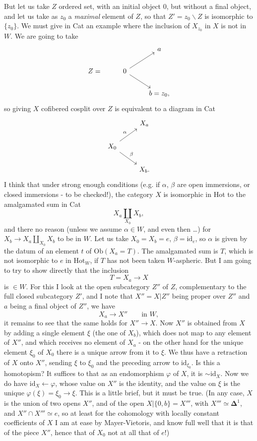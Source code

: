 But let us take $Z$ ordered set, with an initial object $0$, but without a final object, and let us take as $z_0$ a \textit{maximal} element of $Z$, so that $Z' = z_0\backslash Z$ is isomorphic to $\{z_0\}$. We must give in Cat an example where the inclusion of $X_{z_0}$ in $X$ is not in $W$. We are going to take
\[
\begin{tikzcd}
 & & a \\
Z = & 0 \arrow[ur] \arrow[dr] & \\
 & & b = z_0,
\end{tikzcd}
\]
so giving $X$ cofibered cosplit over $Z$ is equivalent to a diagram in Cat
\[
\begin{tikzcd}
 & X_a \\
X_0 \arrow[ur, "\alpha"] \arrow[dr, "\beta"] & \\
 & X_b.
\end{tikzcd}
\]
I think that under strong enough conditions (e.g. if $\alpha$, $\beta$ are open immersions, or closed immersions - to be checked!), the category $X$ is isomorphic in Hot to the amalgamated sum in Cat
\[ X_a{\textstyle\coprod_{X_0}}X_b, \]
and there no reason (unless we assume $\alpha \in W$, and even then \dots) for $X_b \longrightarrow X_a \coprod_{X_0} X_b$ to be in $W$. Let us take $X_0 = X_b = e$, $\beta = \mathrm{id}_e$, so $\alpha$ is given by the datum of an element $t$ of $\mathrm{Ob}(X_a = T)$. The amalgamated sum is $T$, which is not isomorphic to $e$ in $\mathrm{Hot}_W$,
if $T$ has not been taken $W$-aspheric. But I am going to try to show directly that the inclusion
\[ T = X_a \longrightarrow X \]
is $\in W$. For this I look at the open subcategory $Z''$ of $Z$, complementary to the full closed subcategory $Z'$, and I note that $X'' = X|Z''$ being proper over $Z''$ and $a$ being a final object of $Z''$, we have
\[ X_a \longrightarrow X'' \qquad \text{in } W, \]
it remains to see that the same holds for $X'' \longrightarrow X$. Now $X''$ is obtained from $X$ by adding a single element $\xi$ (the one of $X_b$), which does not map to any element of $X''$, and which receives no element of $X_a$ - on the other hand for the unique element $\xi_0$ of $X_0$ there is a unique arrow from it to $\xi$. We thus have a retraction of $X$ onto $X''$, sending $\xi$ to $\xi_0$ and the preceding arrow to $\mathrm{id}_{\xi_0}$. Is this a homotopism? It suffices to that as an endomorphism $\varphi$ of $X$, it is $\sim \mathrm{id}_X$. Now we do have $\mathrm{id}_X \longleftarrow \varphi$, whose value on $X''$ is the identity, and the value on $\xi$ is the unique $\varphi(\xi) = \xi_0 \longrightarrow \xi$. This is a little brief, but it must be true. (In any case, $X$ is the union of two opens $X''$, and of the open $X|\{0,b\} = X'''$, with $X''' \simeq \mathbf{\Delta}^1$, and $X'' \cap X''' \simeq e$, so at least for the cohomology with locally constant coefficients of $X$ I am at ease by Mayer-Vietoris, and know full well that it is that of the piece $X''$, hence that of $X_0$ not at all that of $e$!)

